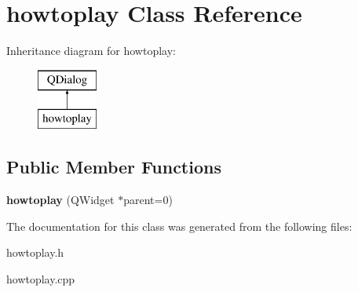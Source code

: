 \hypertarget{classhowtoplay}{}\section{howtoplay Class Reference}
\label{classhowtoplay}
Inheritance diagram for howtoplay\+:\begin{figure}[H]
\begin{center}
\leavevmode
\includegraphics[height=2.000000cm]{classhowtoplay}
\end{center}
\end{figure}
\subsection*{Public Member Functions}
\begin{DoxyCompactItemize}
\item 
\hypertarget{classhowtoplay_aeea3942f728f30ebb23ea8870234eae8}{}{\bfseries howtoplay} (Q\+Widget $\ast$parent=0)\label{classhowtoplay_aeea3942f728f30ebb23ea8870234eae8}

\end{DoxyCompactItemize}


The documentation for this class was generated from the following files\+:\begin{DoxyCompactItemize}
\item 
howtoplay.\+h\item 
howtoplay.\+cpp\end{DoxyCompactItemize}
